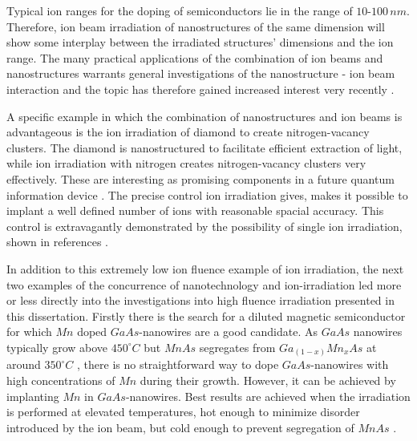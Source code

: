 

Typical ion ranges for the doping of semiconductors lie in the range of $10$-$100\,nm$. Therefore, ion beam irradiation of nanostructures of the same dimension will show some interplay between the irradiated structures' dimensions and the ion range. The many practical applications of the combination of ion beams and nanostructures warrants general investigations of the nanostructure - ion beam interaction and the topic has therefore gained increased interest very recently \cite{borschel_ion-solid_2012,greaves_enhanced_2013,nietiadi_sputtering_2014,johannes_ion_2015,urbassek_sputter_2015}.  

A specific example in which the combination of nanostructures and ion beams is advantageous is the ion irradiation of diamond to create nitrogen-vacancy clusters. The diamond is nanostructured to facilitate efficient extraction of light, while ion irradiation with nitrogen creates nitrogen-vacancy clusters very effectively. These are interesting as promising components in a future quantum information device \cite{babinec_diamond_2010}. The precise control ion irradiation gives, makes it possible to implant a well defined number of ions with reasonable spacial accuracy. This control is extravagantly demonstrated by the possibility of single ion irradiation, shown in references \cite{meijer_concept_2006,ohdomari_single-ion_2008}. 

In addition to this extremely low ion fluence example of ion irradiation, the next two examples of the concurrence of nanotechnology and ion-irradiation led more or less directly into the investigations into high fluence irradiation presented in this dissertation. Firstly there is the search for a diluted magnetic semiconductor for which $Mn$ doped $GaAs$-nanowires are a good candidate. As $GaAs$ nanowires typically grow above $450^\circ C$ but $MnAs$ segregates from $Ga_{(1-x)}Mn_xAs$ at around $350^\circ C$ \cite{dietl_engineering_2006,sadowski_gaasmnas_2011}, there is no straightforward way to dope $GaAs$-nanowires with high concentrations of $Mn$ during their growth. However, it can be achieved by implanting $Mn$ in $GaAs$-nanowires. Best results are achieved when the irradiation is performed at elevated temperatures, hot enough to minimize disorder introduced by the ion beam, but cold enough to prevent segregation of $MnAs$ \cite{borschel_new_2011,paschoal_hopping_2012,borschel_ion-solid_2012,kumar_magnetic_2013,paschoal_magnetoresistance_2014}. 

